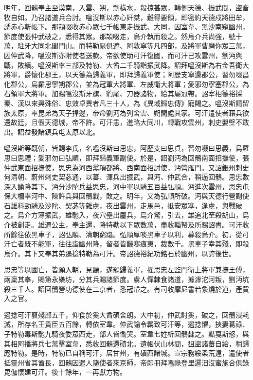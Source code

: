 \begin{pinyinscope}
 明年，回鶻奉主至漠南，入雲、朔，剽橫水，殺掠甚眾，轉側天德、振武間，盜畜牧自如。乃召諸道兵合討。嗢沒斯以赤心奸桀，難得要領，即密約天德戍將田牟，誘赤心斬帳下。那頡啜收赤心眾七千帳東走振武、大同，因室韋、黑沙南窺幽州，節度使張仲武破之，悉得其眾。那頡啜走，烏介執而殺之。然烏介兵尚強，號十萬，駐牙大同北閭門山。而特勒厖俱遮、阿敦寧等凡四部，及將軍曹磨你眾三萬，因仲武降，嗢沒斯亦附使者送款。帝欲使助可汗復國，而可汗已攻雲州，劉沔與戰，敗績。嗢沒斯率三部及特勒、大酋二千騎詣振武降。詔拜嗢沒斯為右金吾衛大將軍，爵懷化郡王，以天德為歸義軍，即拜歸義軍使；阿歷支寧邊郡公，習勿啜昌化郡公，烏羅思寧朔郡公，並為冠軍大將軍、左威衛大將軍；愛邪勿寧塞郡公，為右領軍大將軍。加賜嗢沒斯牙旗、豹尾、刀器諸物，給其屬冠帶。詔宰相德裕採秦、漢以來興殊俗、忠效卓異者凡三十人，為《異域歸忠傳》寵賜之。嗢沒斯請留族太原，率昆弟為天子捍邊，帝命劉沔為列舍雲、朔間處其家。可汗遣使者藉兵欲還故廷，且假天德城，帝不許。可汗恚，進略大同川，轉戰攻雲州，刺史嬰壁不敢出。詔益發諸鎮兵屯太原以北。



 嗢沒斯等既朝，皆賜李氏，名嗢沒斯曰思忠，阿歷支曰思貞，習勿啜曰思義，烏羅思曰思禮；愛邪勿曰弘順，即拜歸義軍副使。於是，詔劉沔為回鶻南面招撫使，張仲武東面招撫使，思忠為河西黨項都將、西南面招討使，沔營雁門。又詔銀州刺史何清朝、蔚州刺史契苾通，以蕃、渾兵出振武，與沔、仲武合，稍逼回鶻。思忠數深入諭降其下。沔分沙陀兵益思忠，河中軍以騎五百益弘順。沔進次雲州，思忠屯保大柵率河中、陳許兵與回鶻戰，敗之。明年，又為弘順所破。沔與天德行營副使石雄料勁騎及沙陀、契苾等雜虜，夜出雲州，走馬邑，抵安眾塞，逢虜，與戰破之。烏介方薄振武，雄馳入，夜穴壘出鏖兵，烏介驚，引去，雄追北至殺胡山，烏介被創走。雄遇公主，奉主還，降特勒以下眾數萬，盡收輜帑及所賜詔書。可汗收所餘往依黑車子，詔弘順、清朝窮躡。弘順厚啖黑車子以利，募殺烏介。初，從可汗亡者既不能軍，往往詣幽州降，留者皆饑寒痕夷，裁數千。黑車子幸其殘，即殺烏介。其下又奉其弟遏捻特勒為可汗。帝詔德裕紀功銘石於幽州，以誇後世。



 思忠等以國亡，皆願入朝，見聽，遂罷歸義軍，擢思忠左監門衛上將軍兼撫王傅，兩稟其奉，賜第永樂坊，分其兵賜諸節度。虜人憚隸食諸道，據滹沱河叛，劉沔坑殺三千人。詔回鶻營功德使在二京者，悉冠帶之。有司收摩尼書若象燒於道，產貲入之官。



 遏捻可汗裒殘部五千，仰食於奚大酋碩舍朗。大中初，仲武討奚，破之，回鶻浸耗滅，所存名王貴臣五百餘，轉依室韋。仲武諭令羈致可汗等，遏捻懼，挾妻葛祿、子特勒毒斯馳九騎夜委眾西走，部人皆慟哭。室韋七姓析回鶻隸之。黠戛斯怒，與其相阿播將兵七萬擊室韋，悉收回鶻還磧北。遺帳伏山林間，狙盜諸蕃自給，稍歸厖特勒。是時，特勒已自稱可汗，居甘州，有磧西諸城。宣宗務綏柔荒遠，遣使者抵靈州省其酋長，回鶻因遣人隨使者來京師，帝即冊拜嗢祿登里邏汨沒蜜施合俱錄毘伽懷建可汗。後十餘年，一再獻方物。




\end{pinyinscope}
